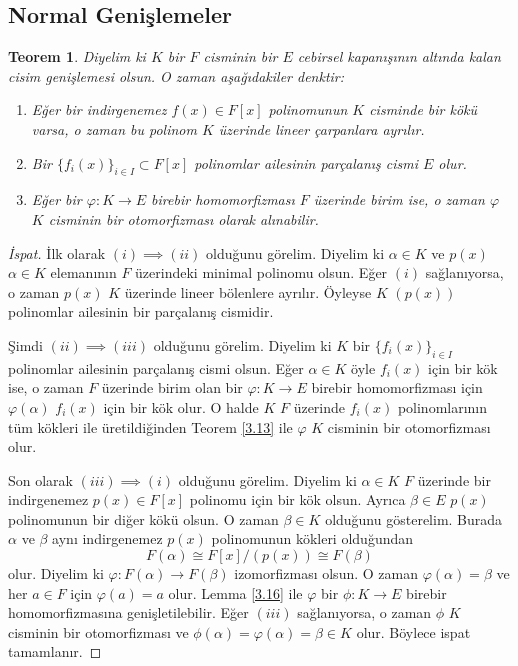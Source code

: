 \documentclass{article}
\newtheorem{thm}{Teorem}[section]
\theoremstyle{definition}
\theoremstyle{remark}
\begin{document}
    	\subsection{Normal Genişlemeler}
    	
    	    \begin{thm}\label{4.3}
    	        Diyelim ki $K$ bir $F$ cisminin bir $E$ cebirsel kapanışının altında kalan cisim genişlemesi olsun. O zaman aşağıdakiler denktir:
    	        \begin{enumerate}
				\renewcommand{\labelenumi}{(\roman{enumi})}
				    \item Eğer bir indirgenemez $f(x) \in F[x]$ polinomunun $K$ cisminde bir kökü varsa, o zaman bu polinom $K$ üzerinde lineer çarpanlara ayrılır.
				    \item Bir $\{f_i(x)\}_{i \in I} \subset F[x]$ polinomlar ailesinin parçalanış cismi $E$ olur.
				    \item Eğer bir $\varphi: K \to E$ birebir homomorfizması $F$ üzerinde birim ise, o zaman $\varphi$ $K$ cisminin bir otomorfizması olarak alınabilir.
				\end{enumerate}
    	    \end{thm}
    	    
    	    \begin{proof}[İspat]
    	        İlk olarak $(i) \implies (ii)$ olduğunu görelim. Diyelim ki $\alpha \in K$ ve $p(x)$ $\alpha \in K$ elemanının $F$ üzerindeki minimal polinomu olsun. Eğer $(i)$ sağlanıyorsa, o zaman $p(x)$ $K$ üzerinde lineer bölenlere ayrılır. Öyleyse $K$ $(p(x))$ polinomlar ailesinin bir parçalanış cismidir.\par
    	        Şimdi $(ii) \implies (iii)$ olduğunu görelim. Diyelim ki $K$ bir $\{f_i(x)\}_{i \in I}$ polinomlar ailesinin parçalanış cismi olsun. Eğer $\alpha \in K$ öyle $f_i(x)$ için bir kök ise, o zaman $F$ üzerinde birim olan bir $\varphi: K \to E$ birebir homomorfizması için $\varphi(\alpha)$ $f_i(x)$ için bir kök olur. O halde $K$ $F$ üzerinde $f_i(x)$ polinomlarının tüm kökleri ile üretildiğinden Teorem \ref{3.13} ile $\varphi$ $K$ cisminin bir otomorfizması olur.\par
    	        Son olarak $(iii) \implies (i)$ olduğunu görelim. Diyelim ki $\alpha \in K$ $F$ üzerinde bir indirgenemez $p(x) \in F[x]$ polinomu için bir kök olsun. Ayrıca $\beta \in E$ $p(x)$ polinomunun bir diğer kökü olsun. O zaman $\beta \in K$ olduğunu gösterelim. Burada $\alpha$ ve $\beta$ aynı indirgenemez $p(x)$ polinomunun kökleri olduğundan
    	        \begin{equation*}
    	            F(\alpha) \cong F[x]/(p(x)) \cong F(\beta)
    	        \end{equation*}
    	        olur. Diyelim ki $\varphi: F(\alpha) \to F(\beta)$ izomorfizması olsun. O zaman $\varphi(\alpha) = \beta$ ve her $a \in F$ için $\varphi(a) = a$ olur. Lemma \ref{3.16} ile $\varphi$ bir $\phi: K \to E$ birebir homomorfizmasına genişletilebilir. Eğer $(iii)$ sağlanıyorsa, o zaman $\phi$ $K$ cisminin bir otomorfizması ve $\phi(\alpha) = \varphi(\alpha) = \beta \in K$ olur. Böylece ispat tamamlanır.
    	    \end{proof}
    	    
\end{document}

